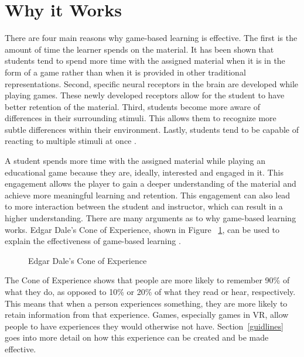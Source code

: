 \section{Why it Works}
There are four main reasons why game-based learning is effective. The first is the amount of time the learner spends on the material. It has been shown that students tend to spend more time with the assigned material when it is in the form of a game rather than when it is provided in other traditional representations. Second, specific neural receptors in the brain are developed while playing games. These newly developed receptors allow for the student to have better retention of the material. Third, students become more aware of differences in their surrounding stimuli. This allows them to recognize more subtle differences within their environment. Lastly, students tend to be capable of reacting to multiple stimuli at once \cite{LaValle2017}. 


A student spends more time with the assigned material while playing an educational game because they are, ideally, interested and engaged in it. This engagement allows the player to gain a deeper understanding of the material and achieve more meaningful learning and retention. This engagement can also lead to more interaction between the student and instructor, which can result in a higher understanding. There are many arguments as to why game-based learning works. Edgar Dale's Cone of Experience, shown in  Figure ~\ref{fig:whatpeoplerememerfigure}, can be used to explain the effectiveness of game-based learning \cite{Davis2015}.
\begin{figure}[!ht]
	\begin{center}
	\end{center}
	\caption{Edgar Dale's Cone of Experience \cite{Davis2015}} \label{fig:whatpeoplerememerfigure}
\end{figure}The Cone of Experience shows that people are more likely to remember 90\% of what they do, as opposed to 10\% or 20\% of what they read or hear, respectively. This means that when a person experiences something, they are more likely to retain information from that experience. Games, especially games in VR, allow people to have experiences they would otherwise not have. Section~\ref{guidlines} goes into more detail on how this experience can be created and be made effective.   


